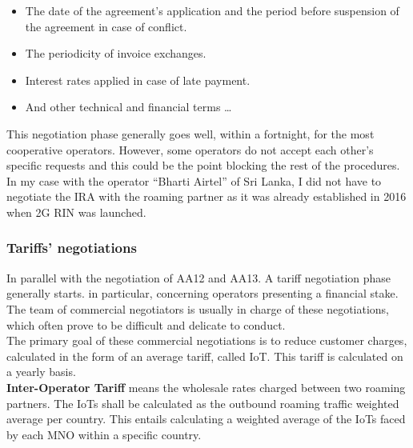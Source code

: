 \begin{itemize}
    \setlength\itemsep{0.2em}
    \item The date of the agreement’s application and the period before suspension of the agreement in case of conflict.
    \item The periodicity of invoice exchanges.
    \item Interest rates applied in case of late payment.
    \item And other technical and financial terms …
\end{itemize}

This negotiation phase generally goes well, within a fortnight, for the most cooperative operators. However, some operators do not accept each other's specific requests and this could be the point blocking the rest of the procedures.\\

In my case with the operator “Bharti Airtel” of Sri Lanka, I did not have to negotiate the IRA with the roaming partner as it was already established in 2016 when \acs{2G} \acs{RIN} was launched.\\

\subsubsection{Tariffs' negotiations}
\-\hspace{0.5cm} In parallel with the negotiation of AA12 and AA13. A tariff negotiation phase generally starts. in particular, concerning operators presenting a financial stake.\\

The team of commercial negotiators is usually in charge of these negotiations, which often prove to be difficult and delicate to conduct.\\

The primary goal of these commercial negotiations is to reduce customer charges, calculated in the form of an average tariff, called \acs{IoT}. This tariff is calculated on a yearly basis.\\

\textbf{Inter-Operator Tariff} means the wholesale rates charged between two roaming partners. The \acs{IoT}s shall be calculated as the outbound roaming traffic weighted average per country. This entails calculating a weighted average of the \acs{IoT}s faced by each \acs{MNO} within a specific country.\\

